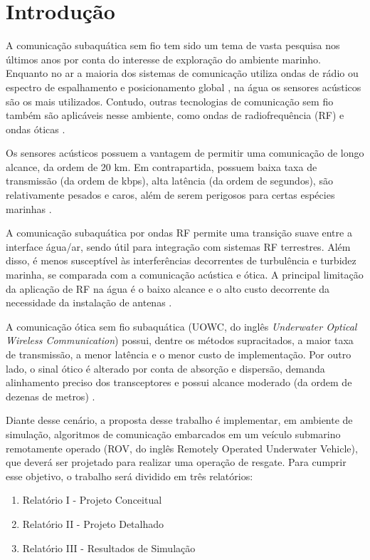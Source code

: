 \section{Introdução}
\label{sec:introducao}


A comunicação subaquática sem fio tem sido um tema de vasta pesquisa nos últimos anos por conta do interesse de exploração do ambiente marinho. Enquanto no ar a maioria dos sistemas de comunicação utiliza ondas de rádio ou espectro de espalhamento e posicionamento global \cite{Paull2014}, na água os sensores acústicos são os mais utilizados. Contudo, outras tecnologias de comunicação sem fio também são aplicáveis nesse ambiente, como ondas de radiofrequência (RF) e ondas óticas \cite{Ur-Rehman2018}.

Os sensores acústicos possuem a vantagem de permitir uma comunicação de longo alcance, da ordem de 20 km. Em contrapartida, possuem baixa taxa de transmissão (da ordem de kbps), alta latência (da ordem de segundos), são relativamente pesados e caros, além de serem perigosos para certas espécies marinhas \cite{Ur-Rehman2018}.

A comunicação subaquática por ondas RF permite uma transição suave entre a interface água/ar, sendo útil para integração com sistemas RF terrestres. Além disso, é menos susceptível às interferências decorrentes de turbulência e turbidez marinha, se comparada com a comunicação acústica e ótica. A principal limitação da aplicação de RF na água é o baixo alcance e o alto custo decorrente da necessidade da instalação de antenas \cite{Ur-Rehman2018}.

A comunicação ótica sem fio subaquática (UOWC, do inglês \textit{Underwater Optical Wireless Communication}) possui, dentre os métodos supracitados, a maior taxa de transmissão, a menor latência e o menor custo de implementação. Por outro lado, o sinal ótico é alterado por conta de absorção e dispersão, demanda alinhamento preciso dos transceptores e possui alcance moderado (da ordem de dezenas de metros) \cite{Ur-Rehman2018}.

Diante desse cenário, a proposta desse trabalho é implementar, em ambiente de simulação, algoritmos de comunicação embarcados em um veículo submarino remotamente operado (ROV, do inglês Remotely Operated Underwater Vehicle), que deverá ser projetado para realizar uma operação de resgate. Para cumprir esse objetivo, o trabalho será dividido em três relatórios:
\vspace{1.5mm}

\begin{enumerate}
	\item Relatório I - Projeto Conceitual
	\item Relatório II - Projeto Detalhado
	\item Relatório III - Resultados de Simulação
\end{enumerate}
\vspace{1.5mm}
 
